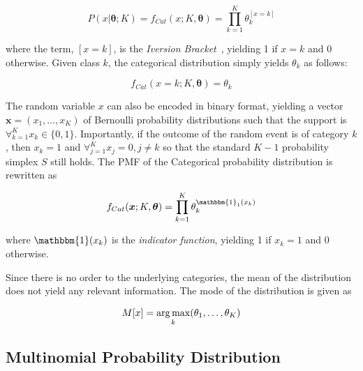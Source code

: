 \begin{equation}
      \label{eq:probability:probability_distributions:categorical:pmf}
      P(x \vert \boldsymbol{\theta}; K) = f_{Cat}(x; K, \boldsymbol{\theta}) = \prod_{k=1}^{K}\theta_{k}^{[x = k]}
\end{equation}

where the term, $[x = k]$, is the \textit{Iversion Bracket}~\cite{ref:iverson:1962}, yielding 1 if $x = k$ and 0 otherwise. Given class $k$, the categorical distribution simply yields $\theta_{k}$ as follows:

\begin{equation}
      \label{eq:probability:probability_distributions:categorical:pmf_k}
      f_{Cat}(x=k; K, \boldsymbol{\theta}) = \theta_{k}
\end{equation}

The random variable $x$ can also be encoded in binary format, yielding a vector $\boldsymbol{x} = (x_{1}, \dots, x_{K})$ of Bernoulli probability distributions such that the support is $\forall_{k=1}^{K} x_{k} \in \{0, 1\}$. Importantly, if the outcome of the random event is of category $k$, then $x_{k} = 1$ and $\forall_{j=1}^{K} x_{j} = 0, j \neq k$ so that the standard $K-1$ probability simplex $S$ still holds. The \acs{PMF} of the Categorical probability distribution is rewritten as

\begin{equation}
      \label{eq:probability:probability_distributions:categorical:pmf_alt}
      f_{Cat}(\boldsymbol{x}; K, \boldsymbol{\theta}) = \prod_{k=1}^{K}\theta_{k}^{\mathbbm{1}_{1}(x_{k})}
\end{equation}

where $\mathbbm{1}(x_{k})$ is the \textit{indicator function}, yielding 1 if $x_{k} = 1$ and 0 otherwise.

Since there is no order to the underlying categories, the mean of the distribution does not yield any relevant information. The mode of the distribution is given as

\begin{equation}
      \label{eq:probability:probability_distributions:categorical:mode}
      M[x] = \operatorname*{arg\,max}_{k}(\theta_{1}, \dots, \theta_{K})
\end{equation}


\subsection{Multinomial Probability Distribution}
\label{sec:probability:probability_distributions:multinomial}

